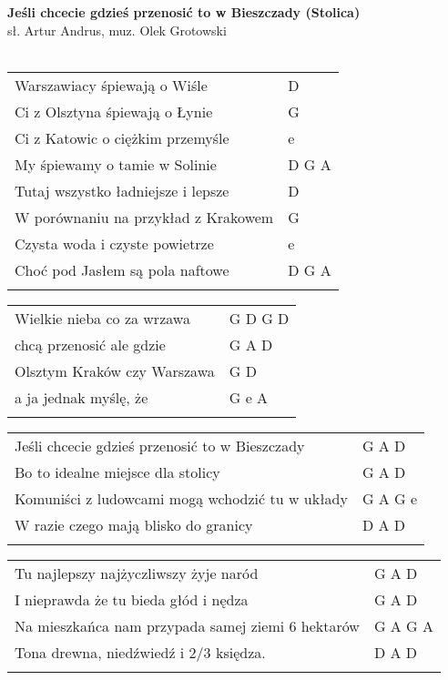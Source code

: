 \documentclass[a5paper]{article}
\begin{document}


\noindent
\fontsize{12pt}{15pt}\selectfont
\textbf{Jeśli chcecie gdzieś przenosić to w Bieszczady (Stolica)} \\
\fontsize{8pt}{10pt}\selectfont
sł. Artur Andrus, muz. Olek Grotowski \\ \\
\fontsize{10pt}{12pt}\selectfont
{}
\begin{tabular}{@{}p{9.5cm}p{3cm}@{}}
\noindent
Warszawiacy śpiewają o Wiśle & D \\
Ci z Olsztyna śpiewają o Łynie & G \\
Ci z Katowic o ciężkim przemyśle & e \\
My śpiewamy o tamie w Solinie & D G A \\
Tutaj wszystko ładniejsze i lepsze & D \\
W porównaniu na przykład z Krakowem & G \\
Czysta woda i czyste powietrze & e \\
Choć pod Jasłem są pola naftowe & D G A \\ \\
\end{tabular}

\noindent
\begin{tabular}{@{}p{9.5cm}p{3cm}@{}}
Wielkie nieba co za wrzawa & G D G D \\
chcą przenosić ale gdzie & G A D \\
Olsztym Kraków czy Warszawa & G D \\
a ja jednak myślę, że & G e A \\ \\
\end{tabular}

\noindent
\begin{tabular}{@{}p{8.5cm}p{3cm}@{}}
Jeśli chcecie gdzieś przenosić to w Bieszczady & G A D \\
Bo to idealne miejsce dla stolicy & G A D \\
Komuniści z ludowcami mogą wchodzić tu w układy & G A G e \\
W razie czego mają blisko do granicy & D A D \\ \\
\end{tabular}

\noindent
\begin{tabular}{@{}p{8.5cm}p{3cm}@{}}
Tu najlepszy najżyczliwszy żyje naród & G A D \\
I nieprawda że tu bieda głód i nędza & G A D \\
Na mieszkańca nam przypada samej ziemi 6 hektarów & G A G A \\
Tona drewna, niedźwiedź i 2/3 księdza. & D A D \\ \\
\end{tabular}
\end{document}
